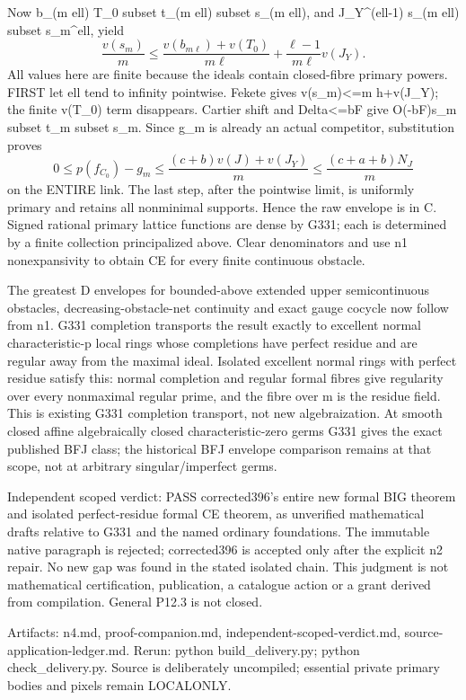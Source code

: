 \documentclass[11pt]{article}
\begin{document}
Now b\_(m ell) T\_0 subset t\_(m ell) subset s\_(m ell), and J\_Y\textasciicircum{}(ell-1) s\_(m ell) subset s\_m\textasciicircum{}ell, yield
\[
\frac{v(s_m)}m\le
\frac{v(b_{m\ell})+v(T_0)}{m\ell}
 +\frac{\ell-1}{m\ell}v(J_Y).
\]
All values here are finite because the ideals contain closed-fibre primary powers. FIRST let ell tend to infinity pointwise. Fekete gives v(s\_m)<=m h+v(J\_Y); the finite v(T\_0) term disappears. Cartier shift and Delta<=bF give O(-bF)s\_m subset t\_m subset s\_m. Since g\_m is already an actual competitor, substitution proves
\[
0\le p(f_{C_0})-g_m
\le\frac{(c+b)v(J)+v(J_Y)}m
\le\frac{(c+a+b)N_J}{m}
\]
on the ENTIRE link. The last step, after the pointwise limit, is uniformly primary and retains all nonminimal supports. Hence the raw envelope is in C. Signed rational primary lattice functions are dense by G331; each is determined by a finite collection principalized above. Clear denominators and use n1 nonexpansivity to obtain CE for every finite continuous obstacle.

The greatest D envelopes for bounded-above extended upper semicontinuous obstacles, decreasing-obstacle-net continuity and exact gauge cocycle now follow from n1. G331 completion transports the result exactly to excellent normal characteristic-p local rings whose completions have perfect residue and are regular away from the maximal ideal. Isolated excellent normal rings with perfect residue satisfy this: normal completion and regular formal fibres give regularity over every nonmaximal regular prime, and the fibre over m is the residue field. This is existing G331 completion transport, not new algebraization. At smooth closed affine algebraically closed characteristic-zero germs G331 gives the exact published BFJ class; the historical BFJ envelope comparison remains at that scope, not at arbitrary singular/imperfect germs.

Independent scoped verdict: PASS corrected396's entire new formal BIG theorem and isolated perfect-residue formal CE theorem, as unverified mathematical drafts relative to G331 and the named ordinary foundations. The immutable native paragraph is rejected; corrected396 is accepted only after the explicit n2 repair. No new gap was found in the stated isolated chain. This judgment is not mathematical certification, publication, a catalogue action or a grant derived from compilation. General P12.3 is not closed.

Artifacts: n4.md, proof-companion.md, independent-scoped-verdict.md, source-application-ledger.md. Rerun: python build\_delivery.py; python check\_delivery.py. Source is deliberately uncompiled; essential private primary bodies and pixels remain LOCALONLY.
\end{document}
